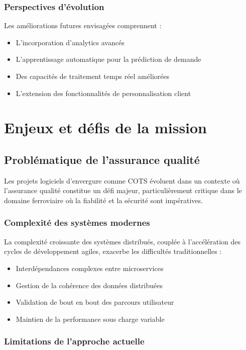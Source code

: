 \subsubsection{Perspectives d'évolution}

Les améliorations futures envisagées comprennent :
\begin{itemize}
    \item L'incorporation d'analytics avancés
    \item L'apprentissage automatique pour la prédiction de demande
    \item Des capacités de traitement temps réel améliorées
    \item L'extension des fonctionnalités de personnalisation client
\end{itemize}

\section{Enjeux et défis de la mission}

\subsection{Problématique de l'assurance qualité}

Les projets logiciels d'envergure comme COTS évoluent dans un contexte où l'assurance qualité constitue un défi majeur, particulièrement critique dans le domaine ferroviaire où la fiabilité et la sécurité sont impératives.

\subsubsection{Complexité des systèmes modernes}

La complexité croissante des systèmes distribués, couplée à l'accélération des cycles de développement agiles, exacerbe les difficultés traditionnelles :
\begin{itemize}
    \item Interdépendances complexes entre microservices
    \item Gestion de la cohérence des données distribuées
    \item Validation de bout en bout des parcours utilisateur
    \item Maintien de la performance sous charge variable
\end{itemize}

\subsubsection{Limitations de l'approche actuelle}

